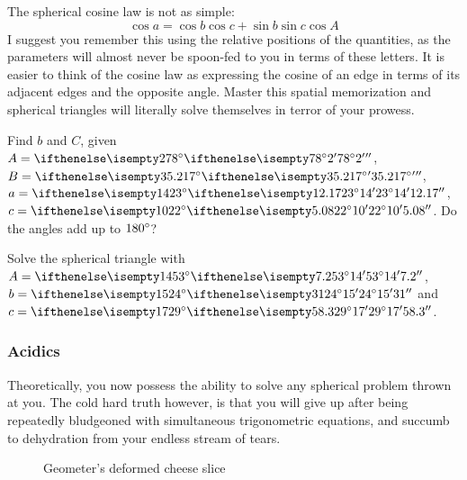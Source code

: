 \documentclass{article}
\begin{document}
\crule

The spherical cosine law is not as simple:
\begin{equation}
\label{eqn:cosine_law}
    \cos a = \cos b \cos c + \sin b \sin c \cos A
\end{equation}
I suggest you remember this using the relative positions of the quantities, as the parameters will almost never be spoon-fed to you in terms of these letters. It is easier to think of the cosine law as expressing the cosine of an edge in terms of its adjacent edges and the opposite angle. Master this spatial memorization and spherical triangles will literally solve themselves in terror of your prowess.

\begin{Exercise}
Find $b$ and $C$, given $A=\sexg{78}{2}{}$, $B=\sexg{35.217}{}{}$, $a=\sexg{23}{14}{12.17}$, $c=\sexg{22}{10}{5.08}$. Do the angles add up to $180{}^{\circ}$?
\end{Exercise}
\begin{Answer}
\end{Answer}
\begin{Exercise}
Solve the spherical triangle with $A=\sexg{53}{14}{7.2}$, $b=\sexg{24}{15}{31}$ and $c=\sexg{29}{17}{58.3}$.
\end{Exercise}
\begin{Answer}
\end{Answer}

\subsubsection{Acidics}
Theoretically, you now possess the ability to solve any spherical problem thrown at you. The cold hard truth however, is that you will give up after being repeatedly bludgeoned with simultaneous trigonometric equations, and succumb to dehydration from your endless stream of tears.

\begin{figure}[h]
    \centering
    \caption{Geometer's deformed cheese slice}
    \label{fig:triangle}
\end{figure}
\end{document}
